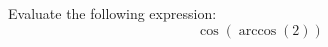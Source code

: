 \documentclass{ximera}
\author{David Kish}
\begin{document}
\begin{exercise}
Evaluate the following expression:
\[
\cos(\arccos(2))
\]
\begin{multipleChoice}
\end{multipleChoice}
\end{exercise}
\end{document}
